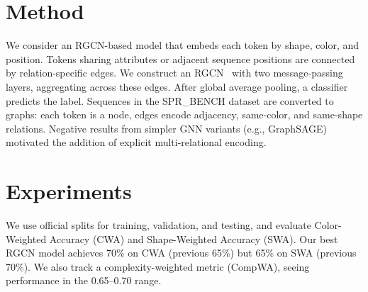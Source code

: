 \documentclass{article} %
\theoremstyle{plain}
\theoremstyle{definition}
\theoremstyle{remark}
\begin{document}
\section{Method}
We consider an RGCN-based model that embeds each token by shape, color, and position. Tokens sharing attributes or adjacent sequence positions are connected by relation-specific edges. We construct an RGCN~\citep{ye2019avr} with two message-passing layers, aggregating across these edges. After global average pooling, a classifier predicts the label. Sequences in the SPR\_BENCH dataset are converted to graphs: each token is a node, edges encode adjacency, same-color, and same-shape relations. Negative results from simpler GNN variants (e.g., GraphSAGE) motivated the addition of explicit multi-relational encoding.

\section{Experiments}
We use official splits for training, validation, and testing, and evaluate Color-Weighted Accuracy (CWA) and Shape-Weighted Accuracy (SWA). Our best RGCN model achieves 70\% on CWA (previous 65\%) but 65\% on SWA (previous 70\%). We also track a complexity-weighted metric (CompWA), seeing performance in the 0.65--0.70 range.
\end{document}

